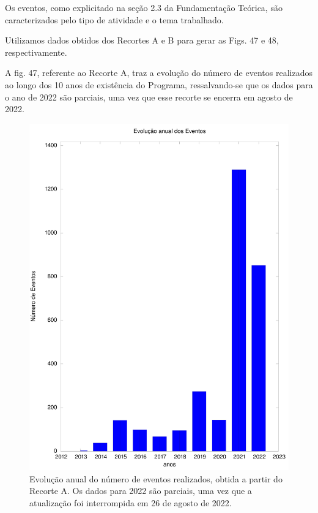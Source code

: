 Os eventos, como explicitado na seção 2.3 da Fundamentação Teórica, são caracterizados pelo tipo de atividade e o tema trabalhado.

Utilizamos dados obtidos dos Recortes A e B para gerar as Figs. 47 e 48, respectivamente.

A fig. 47, referente ao Recorte A, traz a evolução do número de eventos realizados ao longo dos 10 anos de existência do Programa, ressalvando-se que os dados para o ano de 2022 são parciais, uma vez que esse recorte se encerra em agosto de 2022.



\captionsetup{format=plain}
\begin{figure}[htb]

\centering


\begin{minipage}[b]{0.4\linewidth}
        \centering
                \includegraphics[width=1.0\linewidth]{../../../imagens/output-eventos.jpeg}
                \caption{Evolução anual do número de eventos realizados, obtida a partir do Recorte A. Os dados para 2022 são parciais, uma vez que a atualização foi interrompida em 26 de agosto de 2022.}
                \label{8af5236ba8f91623157f8f95ae10366b416d6049}
\end{minipage}%
\hspace{0.5cm}
\end{figure}



